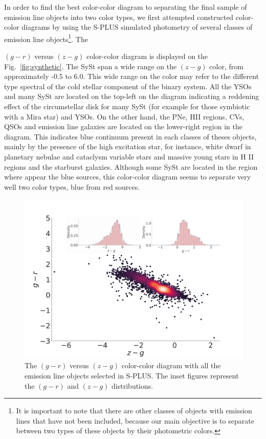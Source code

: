 \documentclass[fleqn,usenatbib]{mnras}
\begin{document}
In order to find the best color-color diagram to separating the final sample of
emission line objects into two color types, we first attempted constructed  color-color
diagrams by using the S-PLUS simulated photometry of several classes of emission line
objects\footnote{It is important to note that there are other classes of objects
with emission lines that have not been included, because our main objective is to
separate between two types of these objects by their photometric colors.}.
The {$(g - r)$ versus $(z - g)$ color-color diagram is displayed on
  the Fig.~\ref{fig:synthetic}. The SySt span a wide range on the $(z - g)$ color,
  from approximately -0.5 to 6.0. This wide range on the color may refer to the different
  type spectral of the cold stellar component of the binary system. All the YSOs and many
  SySt are located on the top-left on the diagram indicating a reddening effect of the
  circumstellar disk for many SySt (for example for those symbiotic with a Mira star)
  and YSOs. On the other hand, the PNe, HII regions, CVs, QSOs and emission line galaxies
  are located on the lower-right region in the diagram. This indicates blue continuum
  present in each classes of theses objects, mainly by the presence of the high excitation
  star, for instance, white dwarf in planetary nebulae and cataclysm variable stars and
  massive young stars in H II regions and the starburst galaxies. Although some SySt are located
  in the region where appear the blue sources, this color-color diagram seems to separate
  very well two color types, blue from red sources.

\begin{figure}
	\includegraphics[width=0.9\linewidth]{Figs/red-blue-colorObjects-gr-edit.jpg}
        \caption{The $(g - r)$ versus $(z - g)$ color-color diagram with all the emission line
          objects selected in S-PLUS. The inset figures represent the $(g - r)$ and  $(z - g)$
        distributions.}
    \label{fig:new-color}
\end{figure}


}
\end{document}
